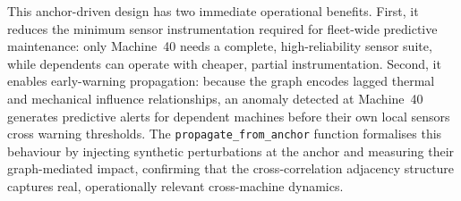 This anchor-driven design has two immediate operational benefits. First, it reduces the minimum sensor instrumentation required for fleet-wide predictive maintenance: only Machine~40 needs a complete, high-reliability sensor suite, while dependents can operate with cheaper, partial instrumentation. Second, it enables early-warning propagation: because the graph encodes lagged thermal and mechanical influence relationships, an anomaly detected at Machine~40 generates predictive alerts for dependent machines before their own local sensors cross warning thresholds. The \texttt{propagate\_from\_anchor} function formalises this behaviour by injecting synthetic perturbations at the anchor and measuring their graph-mediated impact, confirming that the cross-correlation adjacency structure captures real, operationally relevant cross-machine dynamics.

